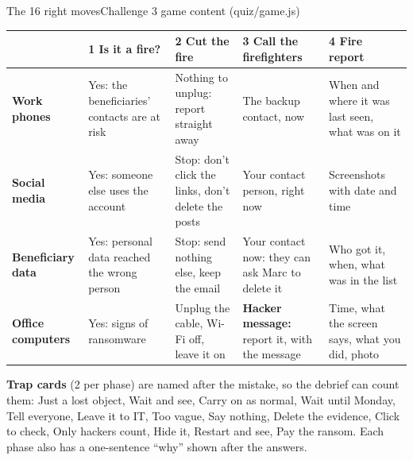 \documentclass[aspectratio=169,11pt,t]{beamer}
\begin{document}
\begin{frame}{The 16 right moves}{Challenge 3 \textbullet{} game content (quiz/game.js)}
  \vspace{0mm}
  \begin{card}[left=3mm, right=3mm, top=1.5mm, bottom=1mm, after skip=1.5mm]
    \tiny\setlength\tabcolsep{2.5pt}\renewcommand{\arraystretch}{1.25}
    \begin{tabular}{@{}L{17mm}L{25mm}L{25mm}L{25mm}L{26mm}@{}}
      & \textcolor{muted}{1 Is it a fire?} & \textcolor{muted}{2 Cut the fire} & \textcolor{muted}{3 Call the firefighters} & \textcolor{muted}{4 Fire report}\\\midrule
      \textbf{Work phones} & Yes: the beneficiaries' contacts are at risk & Nothing to unplug: report straight away & The backup contact, now & When and where it was last seen, what was on it\\
      \textbf{Social media} & Yes: someone else uses the account & Stop: don't click the links, don't delete the posts & Your contact person, right now & Screenshots with date and time\\
      \textbf{Beneficiary data} & Yes: personal data reached the wrong person & Stop: send nothing else, keep the email & Your contact now: they can ask Marc to delete it & Who got it, when, what was in the list\\
      \textbf{Office computers} & Yes: signs of ransomware & Unplug the cable, Wi-Fi off, leave it on & \textbf{Hacker message:} report it, with the message & Time, what the screen says, what you did, photo\\
    \end{tabular}
  \end{card}
  {\scriptsize\textbf{Trap cards} (2 per phase) are named after the mistake, so the debrief can count them: Just a lost object, Wait and see, Carry on as normal, Wait until Monday, Tell everyone, Leave it to IT, Too vague, Say nothing, Delete the evidence, Click to check, Only hackers count, Hide it, Restart and see, Pay the ransom. Each phase also has a one-sentence ``why'' shown after the answers.\par}
\end{frame}
\end{document}
